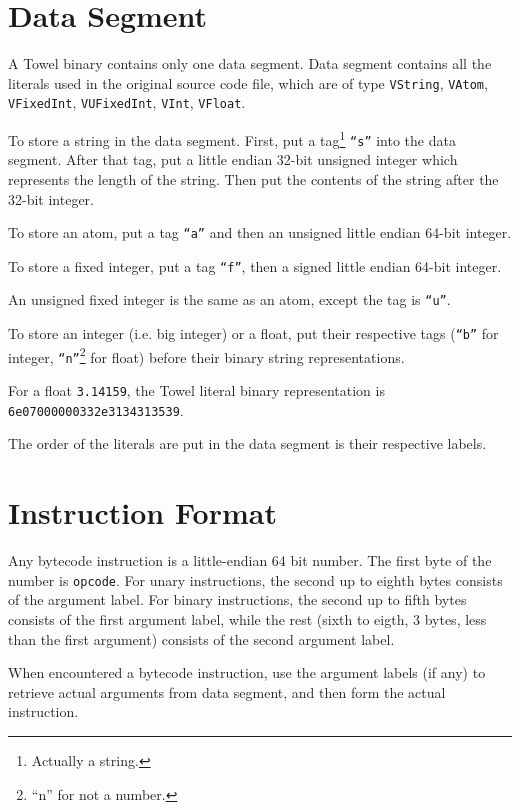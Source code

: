 \documentclass{report}
\begin{document}
\section{Data Segment}
A Towel binary contains only one data segment. Data segment contains all the literals used in the original source code file, which are of type \texttt{VString}, \texttt{VAtom}, \texttt{VFixedInt}, \texttt{VUFixedInt}, \texttt{VInt}, \texttt{VFloat}.

To store a string in the data segment. First, put a tag\footnote{Actually a string.} \texttt{``s''} into the data segment. After that tag, put a little endian 32-bit unsigned integer which represents the length of the string. Then put the contents of the string after the 32-bit integer.

To store an atom, put a tag \texttt{``a''} and then an unsigned little endian 64-bit integer.

To store a fixed integer, put a tag \texttt{``f''}, then a signed little endian 64-bit integer.

An unsigned fixed integer is the same as an atom, except the tag is \texttt{``u''}.

To store an integer (i.e. big integer) or a float, put their respective tags (\texttt{``b''} for integer, \texttt{``n''}\footnote{``n'' for not a number.} for float) before their binary string representations.

\begin{mdframed}[style=example]
  For a float \texttt{3.14159}, the Towel literal binary
  representation is \texttt{6e07000000332e3134313539}.
\end{mdframed}


The order of the literals are put in the data segment is their respective labels.

\section{Instruction Format}

Any bytecode instruction is a little-endian 64 bit number. The first byte of the number is \texttt{opcode}. For unary instructions, the second up to eighth bytes consists of the argument label. For binary instructions, the second up to fifth bytes consists of the first argument label, while the rest (sixth to eigth, 3 bytes, less than the first argument) consists of the second argument label.

When encountered a bytecode instruction, use the argument labels (if any) to retrieve actual arguments from data segment, and then form the actual instruction.
\end{document}
